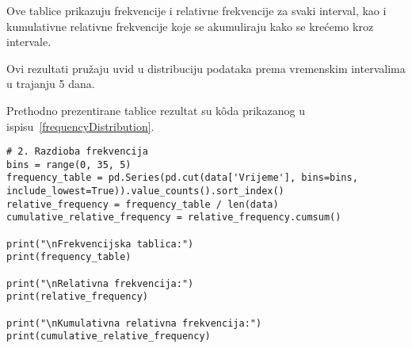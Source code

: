 Ove tablice prikazuju frekvencije i relativne frekvencije za svaki interval, kao i kumulativne relativne frekvencije koje se akumuliraju kako se krećemo kroz intervale.

Ovi rezultati pružaju uvid u distribuciju podataka prema vremenskim intervalima u trajanju 5 dana.

Prethodno prezentirane tablice rezultat su k\^oda prikazanog u ispisu~\ref{frequencyDistribution}.

\begin{lstlisting}[caption={Razdioba frekvencija}, label=frequencyDistribution]
# 2. Razdioba frekvencija
bins = range(0, 35, 5)
frequency_table = pd.Series(pd.cut(data['Vrijeme'], bins=bins, include_lowest=True)).value_counts().sort_index()
relative_frequency = frequency_table / len(data)
cumulative_relative_frequency = relative_frequency.cumsum()

print("\nFrekvencijska tablica:")
print(frequency_table)

print("\nRelativna frekvencija:")
print(relative_frequency)

print("\nKumulativna relativna frekvencija:")
print(cumulative_relative_frequency)
\end{lstlisting}